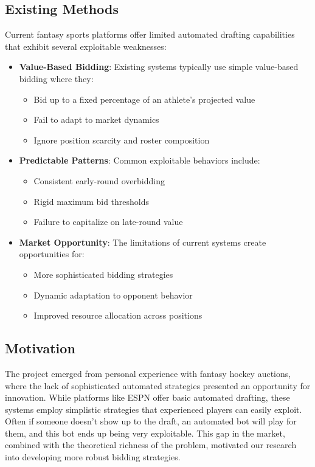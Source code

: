 \documentclass[11pt]{article}
\begin{document}
\subsection{Existing Methods}
Current fantasy sports platforms offer limited automated drafting capabilities that exhibit several exploitable weaknesses:

\begin{itemize}
    \item \textbf{Value-Based Bidding}: Existing systems typically use simple value-based bidding where they:
    \begin{itemize}
        \item Bid up to a fixed percentage of an athlete's projected value
        \item Fail to adapt to market dynamics
        \item Ignore position scarcity and roster composition
    \end{itemize}
    
    \item \textbf{Predictable Patterns}: Common exploitable behaviors include:
    \begin{itemize}
        \item Consistent early-round overbidding
        \item Rigid maximum bid thresholds
        \item Failure to capitalize on late-round value
    \end{itemize}
    
    \item \textbf{Market Opportunity}: The limitations of current systems create opportunities for:
    \begin{itemize}
        \item More sophisticated bidding strategies
        \item Dynamic adaptation to opponent behavior
        \item Improved resource allocation across positions
    \end{itemize}
\end{itemize}

\subsection{Motivation}
The project emerged from personal experience with fantasy hockey auctions, where the lack of sophisticated automated strategies presented an opportunity for innovation. While platforms like ESPN offer basic automated drafting, these systems employ simplistic strategies that experienced players can easily exploit. Often if someone doesn't show up to the draft, an automated bot will play for them, and this bot ends up being very exploitable. This gap in the market, combined with the theoretical richness of the problem, motivated our research into developing more robust bidding strategies.
\end{document}
